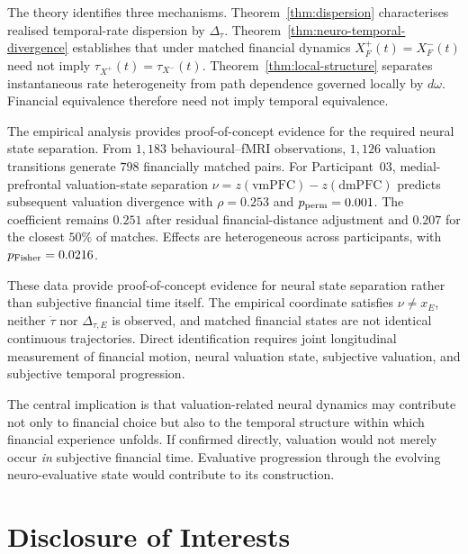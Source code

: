 \documentclass[graybox,natbib]{SNmult}
\providecommand{\1}{}
\renewcommand{\1}{\mathbbm 1}
\begin{document}
The theory identifies three mechanisms. Theorem~\ref{thm:dispersion}
characterises realised temporal-rate dispersion by \(\Delta_\tau\).
Theorem~\ref{thm:neuro-temporal-divergence} establishes that under matched
financial dynamics \(X_F^+(t)=X_F^-(t)\) need not imply
\(\tau_{X^+}(t)=\tau_{X^-}(t)\). Theorem~\ref{thm:local-structure} separates
instantaneous rate heterogeneity from path dependence governed locally by
\(d\omega\). Financial equivalence therefore need not imply temporal
equivalence.

The empirical analysis provides proof-of-concept evidence for the required
neural state separation. From \(1{,}183\) behavioural--fMRI observations,
\(1{,}126\) valuation transitions generate \(798\) financially matched pairs.
For Participant~03, medial-prefrontal valuation-state separation
\(\nu=z(\mathrm{vmPFC})-z(\mathrm{dmPFC})\) predicts subsequent valuation
divergence with \(\rho=0.253\) and \(p_{\rm perm}=0.001\). The coefficient
remains \(0.251\) after residual financial-distance adjustment and \(0.207\)
for the closest \(50\%\) of matches. Effects are heterogeneous across
participants, with \(p_{\rm Fisher}=0.0216\).

These data provide proof-of-concept evidence for neural state separation rather
than subjective financial time itself. The empirical coordinate satisfies \(\nu\neq x_E\),
neither \(\dot{\tau}\) nor \(\Delta_{\tau,E}\) is observed, and matched
financial states are not identical continuous trajectories. Direct
identification requires joint longitudinal measurement of financial motion,
neural valuation state, subjective valuation, and subjective temporal
progression.

The central implication is that valuation-related neural dynamics may
contribute not only to financial choice but also to the temporal structure
within which financial experience unfolds. If confirmed directly, valuation
would not merely occur \emph{in} subjective financial time. Evaluative
progression through the evolving neuro-evaluative state would contribute to
its construction.







\section*{Disclosure of Interests}
\end{document}

